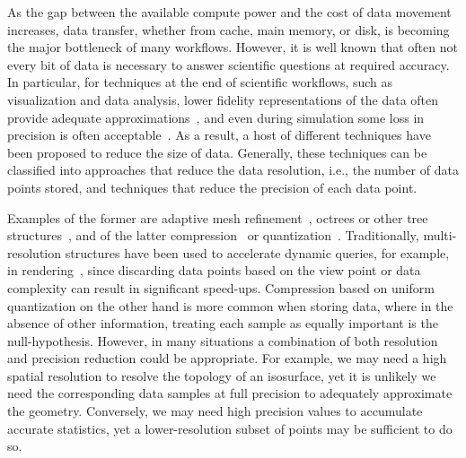 As the gap between the available compute power and the cost of data movement increases, data
transfer, whether from cache, main memory, or disk, is becoming the major bottleneck of many
workflows. However, it is well known that often not every bit of data is necessary to answer
scientific questions at required accuracy. In particular, for techniques at the end of scientific
workflows, such as visualization and data analysis, lower fidelity
representations of the data often
provide adequate approximations~\cite{woodring2011,covra2012,compression_sim2013}, and even during
simulation some loss in precision is often
acceptable~\cite{compression_sim2013,doi:10.1177/1094342018762036}.
As a result, a
host of different techniques have been proposed to reduce the size of data. Generally, these
techniques can be classified into approaches that reduce the data resolution, i.e., the number of
data points stored,
and techniques that reduce the precision of each data point.

Examples of the former are adaptive mesh refinement~\cite{amr1989}, octrees or other tree
structures~\cite{hierarchical1984},
and of the latter
compression~\cite{fpzip,isabela,zfp2014,sz} or
quantization~\cite{vq1992,hvq,sqe}.
Traditionally, multi-resolution structures have been used to accelerate
dynamic queries, for example, in rendering~\cite{multires_octree1999}, since discarding data points
based on the view point or data complexity can result in significant speed-ups. Compression based on
uniform quantization on the other hand is more common when storing data, where in the absence of
other information, treating each sample as equally important is the null-hypothesis. However, in
many situations a combination of both resolution and precision reduction could be appropriate. For
example, we may need a high spatial resolution to resolve the topology of an isosurface, yet it is unlikely we
need the corresponding data samples at full precision to adequately approximate the
geometry. Conversely, we may need high precision values to accumulate accurate statistics, yet a
lower-resolution subset of points may be sufficient to do so. 

